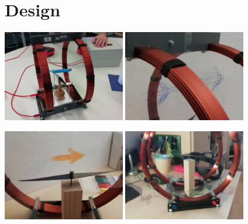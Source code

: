 \part{Design}
\label{part:design}

\begin{frame}
\vspace{-1em}
\begin{center}
	\includegraphics[width=0.4\textwidth]{images/Design_1.jpg}
	\hspace{0.05cm}
	\includegraphics[width=0.4\textwidth]{images/Design_2.jpg}	
	
	
	\includegraphics[width=0.4\textwidth]{images/Design_3.jpg}	
	\hspace{0.05cm}
	\includegraphics[width=0.4\textwidth]{images/Design_4.jpg}	
\end{center}
\end{frame}

